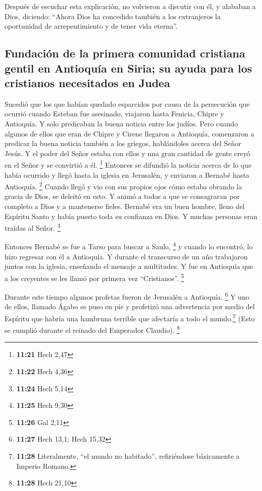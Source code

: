  Después de escuchar esta explicación, no volvieron a
discutir con él, y alababan a Dios, diciendo: ``Ahora Dios ha concedido
también a los extranjeros la oportunidad de arrepentimiento y de tener
vida eterna''.

\hypertarget{fundaciuxf3n-de-la-primera-comunidad-cristiana-gentil-en-antioquuxeda-en-siria-su-ayuda-para-los-cristianos-necesitados-en-judea}{%
\subsection{Fundación de la primera comunidad cristiana gentil en
Antioquía en Siria; su ayuda para los cristianos necesitados en
Judea}\label{fundaciuxf3n-de-la-primera-comunidad-cristiana-gentil-en-antioquuxeda-en-siria-su-ayuda-para-los-cristianos-necesitados-en-judea}}

 Sucedió que los que habían quedado esparcidos por causa
de la persecución que ocurrió cuando Esteban fue asesinado, viajaron
hasta Fenicia, Chipre y Antioquía. Y solo predicaban la buena noticia
entre los judíos.  Pero cuando algunos de ellos que eran
de Chipre y Cirene llegaron a Antioquía, comenzaron a predicar la buena
noticia también a los griegos, hablándoles acerca del Señor Jesús.
 Y el poder del Señor estaba con ellos y una gran
cantidad de gente creyó en el Señor y se convirtió a él. \footnote{\textbf{11:21}
  Hech 2,47}  Entonces se difundió la noticia acerca de
lo que había ocurrido y llegó hasta la iglesia en Jerusalén, y enviaron
a Bernabé hasta Antioquía. \footnote{\textbf{11:22} Hech 4,36}
 Cuando llegó y vio con sus propios ojos cómo estaba
obrando la gracia de Dios, se deleitó en esto. Y animó a todos a que se
consagraran por completo a Dios y a mantenerse fieles. 
Bernabé era un buen hombre, lleno del Espíritu Santo y había puesto toda
su confianza en Dios. Y muchas personas eran traídas al Señor.
\footnote{\textbf{11:24} Hech 5,14}

 Entonces Bernabé se fue a Tarso para buscar a Saulo,
\footnote{\textbf{11:25} Hech 9,30}  y cuando lo
encontró, lo hizo regresar con él a Antioquía. Y durante el transcurso
de un año trabajaron juntos con la iglesia, enseñando el mensaje a
multitudes. Y fue en Antioquía que a los creyentes se les llamó por
primera vez ``Cristianos''. \footnote{\textbf{11:26} Gal 2,11}

 Durante este tiempo algunos profetas fueron de Jerusalén
a Antioquía. \footnote{\textbf{11:27} Hech 13,1; Hech 15,32}
 Y uno de ellos, llamado Ágabo se puso en pie y profetizó
una advertencia por medio del Espíritu que habría una hambruna terrible
que afectaría a todo el mundo.\footnote{\textbf{11:28} Literalmente,
  ``el mundo no habitado'', refiriéndose básicamente a Imperio Romano.}
(Esto se cumplió durante el reinado del Emperador Claudio). \footnote{\textbf{11:28}
  Hech 21,10}

